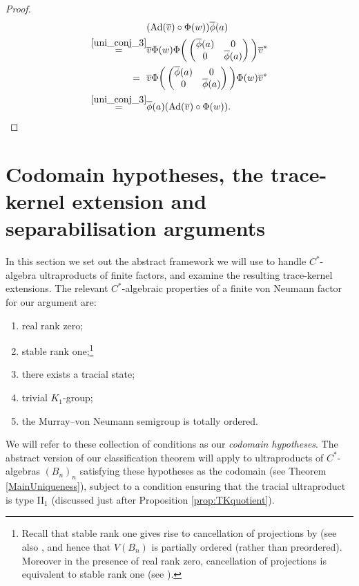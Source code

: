 \documentclass[reqno]{amsart}
\theoremstyle{definition}
\theoremstyle{remark}
\numberwithin{equation}{section}
\theoremstyle{definition}
\begin{document}
\begin{proof}
\begin{align} 
&(\text{Ad}(\overline{v}) \circ \Phi (w)) \overline{\phi}(a) \\
\stackrel{\eqref{uni_conj_3}}{=} &\overline{v} \Phi (w)\Phi \bigg(
\begin{pmatrix}
\overline{\phi}(a) & 0 \\
0 & \overline{\phi}(a)
\end{pmatrix}
\bigg)\overline{v}^{*} \\
= \ \ & \overline{v} \Phi \bigg(
\begin{pmatrix}
\overline{\phi}(a) & 0 \\
0 & \overline{\phi}(a)
\end{pmatrix}
\bigg)\Phi (w)\overline{v}^{*} \\
\stackrel{\eqref{uni_conj_3}}{=} &\overline{\phi}(a)(\text{Ad}(\overline{v}) \circ \Phi (w)). \qedhere 
\end{align} 
\end{proof} 

\section{Codomain hypotheses, the trace-kernel extension and separabilisation arguments} 
\label{Sect:sep}  

In this section we set out the abstract framework we will use to handle $C^*$-algebra ultraproducts of finite factors, and examine the  resulting trace-kernel extensions.  The relevant $C^*$-algebraic properties of a finite von Neumann factor for our argument are:
\begin{enumerate}
    \item real rank zero;\label{codomain1}
    \item stable rank one;\label{codomain2}\footnote{Recall that stable rank one gives rise to cancellation of projections by \cite{Rieffel-stablerank} (see also \cite[Proposition V.3.1.24]{Blackadar}, and hence that $V(B_{n})$ is partially ordered (rather than preordered). Moreover in the presence of real rank zero, cancellation of projections is equivalent to stable rank one (see \cite[Proposition V.3.2.15]{Blackadar}).  } 
    \item there exists a tracial state;\label{codomain3}
    \item trivial $K_1$-group;\label{codomain4}
    \item the Murray--von Neumann semigroup is totally ordered.\label{codomain5}
\end{enumerate}
We will refer to these collection of conditions as our \emph{codomain hypotheses}. The abstract version of our classification theorem will apply to ultraproducts of $C^*$-algebras $(B_n)_{n}$ satisfying these hypotheses as the codomain (see Theorem \ref{MainUniqueness}), subject to a condition ensuring that the tracial ultraproduct is type II$_1$ (discussed just after Proposition \ref{prop:TKquotient}).
\end{document}
